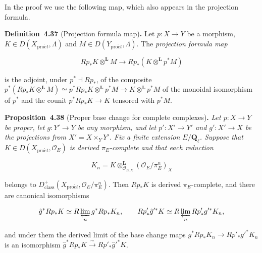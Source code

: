 \documentclass[11pt]{article}
\newenvironment{bpstatement}[2]{\par\addvspace{0.6\baselineskip}\noindent\textbf{#1}#2\textbf{.}\enspace\ignorespaces}
  {\par\addvspace{0.4\baselineskip}}
\newenvironment{bpstatementit}[2]{\begin{bpstatement}{#1}{#2}\itshape\ignorespaces}{\end{bpstatement}}
\begin{document}
In the proof we use the following map, which also appears in the projection formula.

\label{bp112}%
\begin{bpstatement}{Definition~4.37}{ (Projection formula map)}
Let \(p:X\to Y\) be a morphism, \(K\in D(X_{\mathrm{pro}\acute{e}t},\Lambda)\) and \(M\in D(Y_{\mathrm{pro}\acute{e}t},\Lambda)\). The \emph{projection formula map}

\[
Rp_*K\otimes^{\mathbf L}M\longrightarrow Rp_*(K\otimes^{\mathbf L}p^*M)
\tag{4.14}
\]

is the adjoint, under \(p^*\dashv Rp_*\), of the composite \(p^*(Rp_*K\otimes^{\mathbf L}M)\simeq p^*Rp_*K\otimes^{\mathbf L}p^*M
\to K\otimes^{\mathbf L}p^*M\) of the monoidal isomorphism of \(p^*\) and the counit \(p^*Rp_*K\to K\) tensored with \(p^*M\).
\end{bpstatement}

\label{bp113}%
\begin{bpstatementit}{Proposition~4.38}{ (Proper base change for complete complexes)}
Let \(p:X\to Y\) be proper, let \(g:Y'\to Y\) be any morphism, and let \(p':X'\to Y'\) and \(g':X'\to X\) be the projections from \(X'=X\times_YY'\). Fix a finite extension \(E/\mathbf Q_\ell\). Suppose that \(K\in D(X_{\mathrm{pro}\acute{e}t},\mathcal O_E)\) is derived \(\pi_E\)-complete and that each reduction

\[
K_n=K\otimes^{\mathbf L}_{\mathcal O_{E,X}}
(\mathcal O_E/\pi_E^n)_X
\]

belongs to \(D^+_{\mathrm{class}}(X_{\mathrm{pro}\acute{e}t},\mathcal O_E/\pi_E^n)\). Then \(Rp_*K\) is derived \(\pi_E\)-complete, and there are canonical isomorphisms

\[
\hat g^*Rp_*K\simeq R\varprojlim_n g^*Rp_*K_n,
\qquad
Rp'_*\hat g'^*K\simeq R\varprojlim_n Rp'_*g'^*K_n,
\]

and under them the derived limit of the base change maps \(g^*Rp_*K_n\to Rp'_*g'^*K_n\) is an isomorphism \(\hat g^*Rp_*K\xrightarrow{\ \sim\ }Rp'_*\hat g'^*K\).
\end{bpstatementit}
\end{document}
